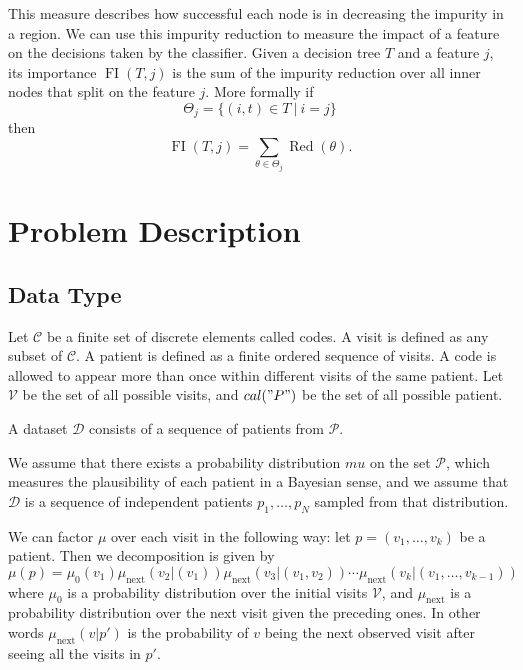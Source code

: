 \documentclass[]{marticle}
\newcommand{\ds}{\mathcal{D}}
\newcommand{\codes}{\mathcal{C}}
\newcommand{\patients}{\mathcal{P}}
\newcommand{\visits}{\mathcal{V}}
\DeclareMathOperator{\Red}{Red}
\DeclareMathOperator{\FI}{FI}
\begin{document}
This measure describes how successful each node is in decreasing the impurity in a region. We can
use this impurity reduction to measure the impact of a feature on the decisions taken by the
classifier. Given a decision tree $T$ and a feature $j$, its importance $\FI(T, j)$ is the sum of
the impurity reduction over all inner nodes that split on the feature $j$. More formally if 
\begin{equation*}
    \Theta_j = \{(i, t) \in T \ |\ i = j\}
\end{equation*}
then 
\begin{equation*}
    \FI(T, j) = \sum_{\theta \in \Theta_j} \Red(\theta).
\end{equation*}

\section{Problem Description}

\subsection{Data Type} \label{sect-datashape}

Let $\codes$ be a finite set of discrete elements called codes. A visit is defined as any subset
of $\codes$. A patient is defined as a finite ordered sequence of visits. A code is allowed to
appear more than once within different visits of the same patient. Let $\visits$ be the set of all
possible visits, and $cal("P")$ be the set of all possible patient.

A dataset $\ds$ consists of a sequence of patients from $\patients$.

We assume that there exists a probability distribution $mu$ on the set $\patients$, which measures
the plausibility of each patient in a Bayesian sense, and we assume that $\ds$ is a sequence of
independent patients $p_1, \dots, p_N$ sampled from that distribution.

We can factor $\mu$ over each visit in the following way: let $p=(v_1, \dots, v_k)$ be a patient. Then
we decomposition is given by
$$ \mu(p) = \mu_0(v_1) \mu_\text{next} (v_2 | (v_1)) \mu_\text{next} (v_3 |
    (v_1, v_2)) \cdots \mu_\text{next} (v_k | (v_1, \dots, v_{k-1})) $$
where $\mu_0$ is a probability distribution over the initial visits $\visits$, and $\mu_\text{next}$ is a
probability distribution over the next visit given the preceding ones. In other words $\mu_\text{next} (v
| p')$ is the probability of $v$ being the next observed visit after seeing all the visits in $p'$.
\end{document}
